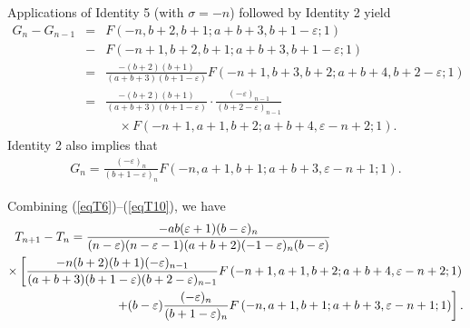 \documentclass[final,oneeqnum]{siamltex}
\begin{document}
\noindent Applications of Identity 5 (with  $\sigma=-n$) followed by
Identity 2 yield
\begin{eqnarray} 
G_{n} - G_{n-1} &=& F\left(-n,b+2,b+1;a+b+3,b+1-\varepsilon;1\right) \nonumber \\
&-& F\left(-n+1,b+2,b+1;a+b+3,b+1-\varepsilon;1\right) \nonumber \\
&=& \frac{-(b+2)(b+1)}{(a+b+3)(b+1-\varepsilon)}F\left(-n+1,b+3,b+2;a+b+4,b+2-\varepsilon;1\right)\nonumber \\
&=& \frac{-(b+2)(b+1)}{(a+b+3)(b+1-\varepsilon)}\cdot\frac{(-\varepsilon)_{n-1}}
{(b+2-\varepsilon)_{n-1}}\nonumber \\
&\ & \quad \times F\left(-n+1,a+1,b+2;a+b+4,\varepsilon-n+2;1\right).\  \label{eqT9}
\end{eqnarray}
Identity 2 also implies that
\begin{eqnarray} 
G_{n} = \frac{(-\varepsilon)_{n}}{(b+1-
\varepsilon)_{n}}F\left(-n,a+1,b+1;a+b+3,\varepsilon-n+1;1\right).
\label{eqT10}
\end{eqnarray}

\noindent Combining (\ref{eqT6})--(\ref{eqT10}),  we have
\begin{eqnarray} 
T_{n+1} - T_{n}  = \frac{-a b
(\varepsilon+1)(b-\varepsilon)_{n}}{(n-\varepsilon)(n-\varepsilon-1)(a+b+2)(-1
-\varepsilon)_{n}(b-\varepsilon)}\hspace*{1.5in} 
\nonumber\\ 
\times\left[\frac{-n(b+2)(b+1)(-\varepsilon)_{n-1}}{(a+b+3)(b+1-\varepsilon)(b+2
-\varepsilon)_{n-1}}
F\left(-n+1,a+1,b+2;a+b+4,\varepsilon-n+2 ;1\right) \right.\nonumber \\ \left.
+(b-\varepsilon)\frac{(-\varepsilon)_{n}}{(b+1-\varepsilon)_{n}}F\left(-n,a+1,b+
1;a+b+3,\varepsilon-n+1;1\right)\right].
\label{eqT11}
\end{eqnarray}
\end{document}
